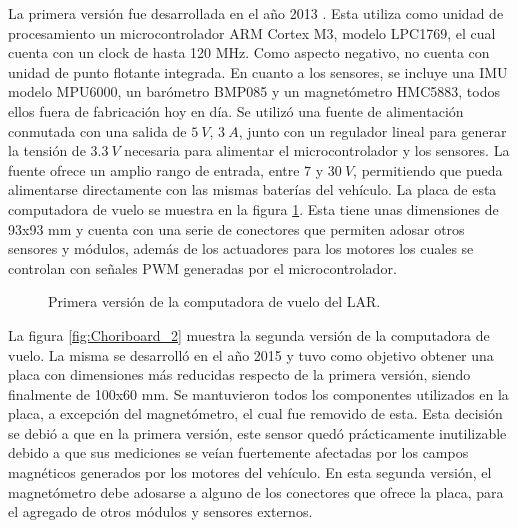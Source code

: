 
La primera versión fue desarrollada en el año 2013 \cite{Pose2014}. Esta utiliza como unidad de procesamiento un microcontrolador ARM Cortex M3, modelo LPC1769, el cual cuenta con un clock de hasta 120 MHz. Como aspecto negativo, no cuenta con unidad de punto flotante integrada. En cuanto a los sensores, se incluye una IMU modelo MPU6000, un barómetro BMP085 y un magnetómetro HMC5883, todos ellos fuera de fabricación hoy en día. Se utilizó una fuente de alimentación conmutada con una salida de $5 \ V$, $3 \ A$, junto con un regulador lineal para generar la tensión de $3.3 \ V$ necesaria para alimentar el microcontrolador y los sensores. La fuente ofrece un amplio rango de entrada, entre $7$ y $30 \ V$, permitiendo que pueda alimentarse directamente con las mismas baterías del vehículo. La placa de esta computadora de vuelo se muestra en la figura \ref{fig:Choriboard_1}. Esta tiene unas dimensiones de 93x93 mm y cuenta con una serie de conectores que permiten adosar otros sensores y módulos, además de los actuadores para los motores los cuales se controlan con señales PWM generadas por el microcontrolador.

\begin{figure}[htb]
    \centering
    
    \caption{Primera versión de la computadora de vuelo del LAR.}
    \label{fig:Choriboard_1}
\end{figure}

La figura \ref{fig:Choriboard_2} muestra la segunda versión de la computadora de vuelo. La misma se desarrolló en el año 2015 y tuvo como objetivo obtener una placa con dimensiones más reducidas respecto de la primera versión, siendo finalmente de 100x60 mm. Se mantuvieron todos los componentes utilizados en la placa, a excepción del magnetómetro, el cual fue removido de esta. Esta decisión se debió a que en la primera versión, este sensor quedó prácticamente inutilizable debido a que sus mediciones se veían fuertemente afectadas por los campos magnéticos generados por los motores del vehículo. En esta segunda versión, el magnetómetro debe adosarse a alguno de los conectores que ofrece la placa, para el agregado de otros módulos y sensores externos.

